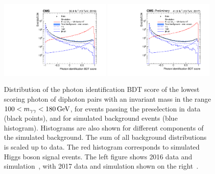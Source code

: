 \begin{figure}[h!]
  \centering
  \includegraphics[width=0.49\textwidth]{Figures/Objects/IDMVA2016}
  \includegraphics[width=0.49\textwidth]{Figures/Objects/IDMVA2017}
  \caption[Photon identification BDT score distributions.]
  {
    Distribution of the photon identification BDT score of the lowest scoring photon
    of diphoton pairs with an invariant mass in the range $100 < m_{\gamma\gamma} < \SI{180}{GeV}$, 
    for events passing the preselection in data (black points), 
    and for simulated background events (blue histogram). 
    Histograms are also shown for different components of the simulated background.
    The sum of all background distributions is scaled up to data. 
    The red histogram corresponds to simulated Higgs boson signal events. 
    The left figure shows 2016 data and simulation~\cite{HIG-16-040}, 
    with 2017 data and simulation shown on the right~\cite{HIG-18-029}.
  }
  \label{fig:obj_IDMVA}
\end{figure}

